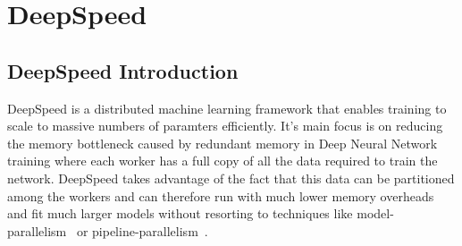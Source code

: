 \chapter{DeepSpeed}
\label{chap:deepspeed}

\section{DeepSpeed Introduction}
DeepSpeed is a distributed machine learning framework that enables training to
scale to massive numbers of paramters efficiently.
It's main focus is on reducing the memory bottleneck caused by redundant
memory in Deep Neural Network training where each worker has a full
copy of all the data required to train the network.
DeepSpeed takes advantage of the fact that this data can be partitioned
among the workers and can therefore run with much lower memory overheads
and fit much larger models without resorting to techniques like
model-parallelism~\cite{corr/abs-1909-08053, nips/2018/shazeer} or
pipeline-parallelism~\cite{nips/2019/huang, sosp/2019/narayanan}.

